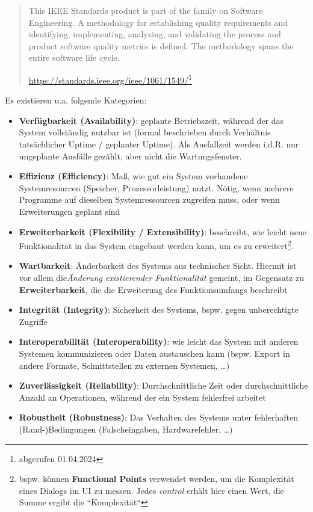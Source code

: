 \blockquote[{\url{https://standards.ieee.org/ieee/1061/1549/}\footnote{abgerufen 01.04.2024}}]{
    This IEEE Standards product is part of the family on Software Engineering. A methodology for establishing quality requirements and identifying, implementing, analyzing, and validating the process and product software quality metrics is defined. The methodology spans the entire software life cycle.
}

\noindent
Es existieren u.a. folgende Kategorien:

\begin{itemize}
    \item \textbf{Verfügbarkeit (Availability)}: geplante Betriebszeit, während der das System vollständig nutzbar ist (formal beschrieben durch Verhältnis tatsächlicher Uptime / geplanter Uptime).
    Als Ausfallzeit werden i.d.R. nur ungeplante Ausfälle gezählt, aber nicht die Wartungsfenster.
    \item \textbf{Effizienz (Efficiency)}: Maß, wie gut ein System vorhandene Systemresourcen (Speicher, Prozessorleistung) nutzt.
    Nötig, wenn mehrere Programme auf dieselben Systemressourcen zugreifen muss, oder wenn Erweiterungen geplant sind
    \item \textbf{Erweiterbarkeit (Flexibility / Extensibility)}: beschreibt, wie leicht neue Funktionalität in das System eingebaut werden kann, um es zu erweitert\footnote{
        bspw. können \textbf{Functional Points} verwendet werden, um die Komplexität eines Dialogs im UI zu messen. Jedes \textit{control} erhält hier einen Wert, die Summe ergibt die ``Komplexität``
    }.
    \item \textbf{Wartbarkeit}: Änderbarkeit des Systems aus technischer Sicht.
    Hiermit ist vor allem die\textit{Änderung existierender Funktionalität} gemeint, im Gegensatz zu \textbf{Erweiterbarkeit}, die die Erweiterung des Funktionsumfangs beschreibt
    \item \textbf{Integrität (Integrity)}: Sicherheit des Systems, bspw. gegen unberechtigte Zugriffe
    \item \textbf{Interoperabilität (Interoperability)}: wie leicht das System mit anderen Systemen kommunizieren oder Daten austauschen kann (bspw. Export in andere Formate, Schnittstellen zu externen Systemen, \ldots)
    \item \textbf{Zuverlässigkeit (Reliability)}: Durchschnittliche Zeit oder durchschnittliche Anzahl an Operationen, während der ein System fehlerfrei arbeitet
    \item \textbf{Robustheit (Robustness)}: Das Verhalten des Systems unter fehlerhaften (Rand-)Bedingungen (Falscheingaben, Hardwarefehler, \ldots)

\end{itemize}
